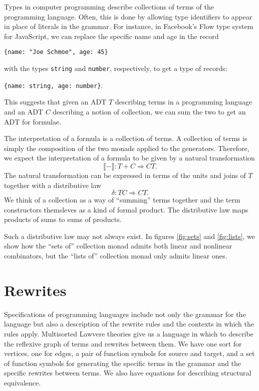 \documentclass[sigplan,9pt,review,anonymous]{acmart}\settopmatter{printfolios=true,printccs=false,printacmref=false}
\newcommand{\maps}{\colon}
\newcommand{\interp}[1]{\llbracket #1 \rrbracket}
\begin{document}
Types in computer programming describe collections of terms of the programming language.  Often, this is done by allowing type identifiers to appear in place of literals in the grammar.  For instance, in Facebook's Flow type system for JavaScript, we can replace the specific name and age in the record 
\begin{center}
  {\tt \{name: "Joe Schmoe", age: 45\}}
\end{center}
with the types {\tt string} and {\tt number}, respectively, to get a type of records:
\begin{center}
  {\tt \{name: string, age: number\}}.
\end{center}
This suggests that given an ADT $T$ describing terms in a programming language and an ADT $C$ describing a notion of collection, we can sum the two to get an ADT for formulae.  

The interpretation of a formula is a collection of terms.  A collection of terms is simply the composition of the two monads applied to the generators.  Therefore, we expect the interpretation of a formula to be given by a natural transformation
\[ \interp{-}\maps T+C \Rightarrow CT. \]
The natural transformation can be expressed in terms of the units and joins of $T$ together with a distributive law
\[ \delta\maps TC \Rightarrow CT. \]
We think of a collection as a way of ``summing'' terms together and the term constructors themsleves as a kind of formal product.  The distributive law maps products of sums to sums of products.

Such a distributive law may not always exist.  In figures \ref{fig:sets} and \ref{fig:lists}, we show how the ``sets of'' collection monad admits both linear and nonlinear combinators, but the ``lists of'' collection monad only admits linear ones.

\section{Rewrites}
Specifications of programming languages include not only the grammar for the language but also a description of the rewrite rules and the contexts in which the rules apply.  Multisorted Lawvere theories give us a language in which to describe the reflexive graph of terms and rewrites between them.  We have one sort for vertices, one for edges, a pair of function symbols for source and target, and a set of function symbols for generating the specific terms in the grammar and the specific rewrites between terms.  We also have equations for describing structural equivalence.
\end{document}

